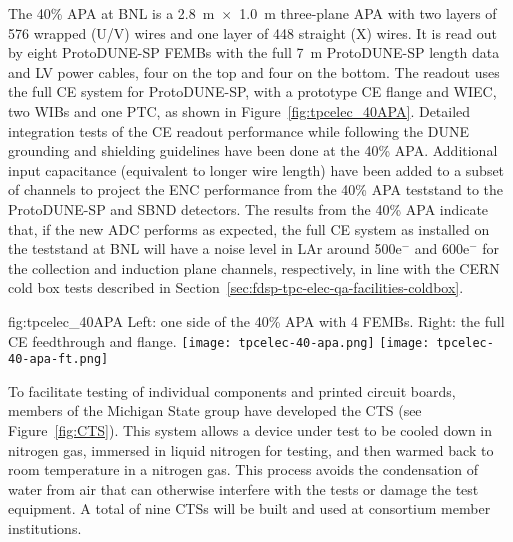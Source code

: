 The 40\% APA at BNL is a 2.8~m~$\times$~1.0~m three-plane APA with two layers of 576 wrapped (U/V) wires and one layer of 448 straight (X) wires. It is read out by eight ProtoDUNE-SP FEMBs with the full 7~m ProtoDUNE-SP length data and LV power cables, four on the top and four on the bottom. The readout uses the full CE system for ProtoDUNE-SP, with a prototype CE flange and WIEC, two WIBs and one PTC, as shown in Figure~\ref{fig:tpcelec_40APA}. Detailed integration tests of the CE readout performance while following the DUNE grounding and shielding guidelines have been done at the 40\% APA. Additional input capacitance (equivalent to longer wire length) have been added to a subset of channels to project the ENC performance from the 40\% APA teststand to the ProtoDUNE-SP and SBND detectors. The results from the 40\% APA indicate that, if the new ADC performs as expected, the full CE system as installed on the teststand at BNL will have a noise level in LAr around 500e$^-$ and 600e$^-$ for the collection and induction plane channels, respectively, in line with the CERN cold box tests described in Section~\ref{sec:fdsp-tpc-elec-qa-facilities-coldbox}.

\begin{dunefigure}
{fig:tpcelec_40APA}
{Left: one side of the 40\% APA with 4 FEMBs.  Right: the full CE feedthrough and flange.}
\texttt{[image: tpcelec-40-apa.png]}
\hspace{3mm}
\texttt{[image: tpcelec-40-apa-ft.png]}
\end{dunefigure}


To facilitate testing of individual components and printed circuit boards, members of the Michigan State group have developed the CTS (see Figure~\ref{fig:CTS}).  This system allows a device under test to be cooled down in nitrogen gas, immersed in liquid nitrogen for testing, and then warmed back to room temperature in a nitrogen gas.  This process avoids the condensation of water from air that can otherwise interfere with the tests or damage the test equipment.  A total of nine CTSs will be built and used at consortium member institutions.

